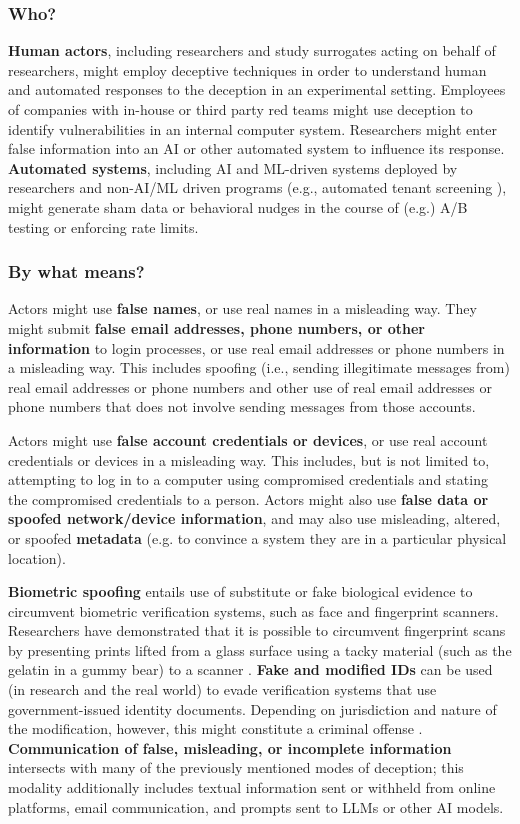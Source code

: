 \subsubsection{Who?} 

\textbf{Human actors}, including researchers and study surrogates acting on behalf of researchers, might employ deceptive techniques in order to understand human and automated responses to the deception in an experimental setting. Employees of companies with in-house or third party red teams might use deception to identify vulnerabilities in an internal computer system. Researchers might enter false information into an AI or other automated system to influence its response. \textbf{Automated systems}, including AI and ML-driven systems deployed by researchers and non-AI/ML driven programs (e.g., automated tenant screening \cite{oyama2009not}), might generate sham data or behavioral nudges in the course of (e.g.) A/B testing or enforcing rate limits. 

\subsubsection{By what means?}

Actors might use \textbf{false names}, or use real names in a misleading way.
They might submit \textbf{false email addresses, phone numbers, or other information} to login processes, or use real email addresses or phone numbers in a misleading way. This includes spoofing (i.e., sending illegitimate messages from) real email addresses or phone numbers and other use of real email addresses or phone numbers that does not involve sending messages from those accounts.

Actors might use \textbf{false account credentials or devices}, or use real account credentials or devices in a misleading way. This includes, but is not limited to, attempting to log in to a computer using compromised credentials and stating the compromised credentials to a person. 
Actors might also use \textbf{false data or spoofed network/device information}, and may also use misleading, altered, or spoofed \textbf{metadata} (e.g. to convince a system they are in a particular physical location).

\textbf{Biometric spoofing} entails use of substitute or fake biological evidence to circumvent biometric verification systems, such as face and fingerprint scanners. Researchers have demonstrated that it is possible to circumvent fingerprint scans by presenting prints lifted from a glass surface using a tacky material (such as the gelatin in a gummy bear) to a scanner \cite{matsumoto2002impact}. \textbf{Fake and modified IDs} can be used (in research and the real world) to evade verification systems that use government-issued identity documents. Depending on jurisdiction and nature of the modification, however, this might constitute a criminal offense \cite{hunt2023kind}. \textbf{Communication of false, misleading, or incomplete information} intersects with many of the previously mentioned modes of deception; this modality additionally includes textual information sent or withheld from online platforms, email communication, and prompts sent to LLMs or other AI models.


